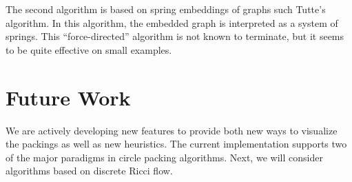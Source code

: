 \documentclass[a4paper,UKenglish]{lipics-v2016}
\begin{document}
  The second algorithm is based on spring embeddings of graphs such Tutte's algorithm.
  In this algorithm, the embedded graph is interpreted as a system of springs. 
  This ``force-directed'' algorithm is not known to terminate, but it seems to be quite effective on small examples.


\section{Future Work} 
\label{sec:future_work}

  We are actively developing new features to provide both new ways to visualize the packings as well as new heuristics.
  The current implementation supports two of the major paradigms in circle packing algorithms.
  Next, we will consider algorithms based on discrete Ricci flow.
  

\end{document}
